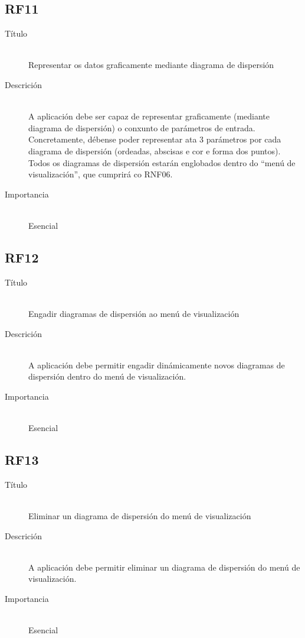 \subsection*{RF11}
\begin{description}
\item[Título] \hfill \\
Representar os datos graficamente mediante diagrama de dispersión
\item[Descrición] \hfill \\
A aplicación debe ser capaz de representar graficamente (mediante diagrama de dispersión) o conxunto de parámetros de entrada. Concretamente, débense poder representar ata 3 parámetros por cada diagrama de dispersión (ordeadas, abscisas e cor e forma dos puntos). Todos os diagramas de dispersión estarán englobados dentro do ``menú de visualización'', que cumprirá co RNF06.
\item[Importancia] \hfill \\
Esencial
\end{description}

\subsection*{RF12}
\begin{description}
\item[Título] \hfill \\
Engadir diagramas de dispersión ao menú de visualización
\item[Descrición] \hfill \\
A aplicación debe permitir engadir dinámicamente novos diagramas de dispersión dentro do menú de visualización.
\item[Importancia] \hfill \\
Esencial
\end{description}

\subsection*{RF13}
\begin{description}
\item[Título] \hfill \\
Eliminar un diagrama de dispersión do menú de visualización
\item[Descrición] \hfill \\
A aplicación debe permitir eliminar un diagrama de dispersión do menú de visualización.
\item[Importancia] \hfill \\
Esencial
\end{description}

